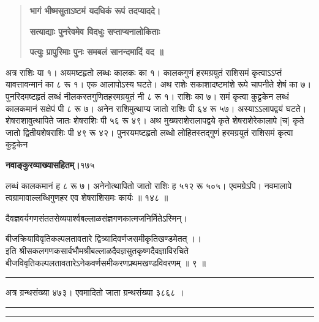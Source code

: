 \documentclass[11pt, openany]{book}
\begin{document}
\begin{sloppypar}
\begin{quote}
\hspace{1in}\textbf{भागं भीष्मसुताऽष्टमं यदधिकं रूपं तदप्याददे।}

\hspace{1in}\textbf{सत्याद्याः पुनरेवमेव विदधुः सप्ताप्यनालोकिताः}

\hspace{1in}\textbf{पत्युः प्रापुरिमाः पुनः समबलं सानन्दमादिं वद ॥}
\end{quote}

\hangindent=0.2in \hspace{0.2in}अत्र राशिः या १। अयमष्टहृतो लब्धः कालकः का १। कालकगुणं हरमग्रयुतं राशिसमं कृत्वाऽऽप्तं यावत्तावन्मानं का ८ रू १। एक आलापोऽस्य घटते। अथ राशेः सकाशादष्टमांशे रूपे चापनीते शेषं का ७। पुनरिदमष्टहृतं लब्धं नीलकस्तगुणितहरमग्रयुतं नी ८ रू १। राशिः का ७। समं कृत्वा कुट्टकेन लब्धं कालकमानं सक्षेपं पी ८ रू ७। अनेन राशिमुत्थाप्य जातो राशिः पी ६४ रू ५७। अस्याऽऽलापद्वयं घटते। शेषराशावुत्थापिते जातः शेषराशिः पी ५६ रू ४९। अथ मुख्यराशेरालापद्वये कृते शेषराशेरेकालापे [च] कृते जातो द्वितीयशेषराशिः पी ४९ रू ४२। पुनरयमष्टहृतो लब्धो लोहितस्तद्गुणं हरमग्रयुतं राशिसमं कृत्वा कुट्टकेन
\end{sloppypar}
\thispagestyle{empty}
\newpage

\onehalfspacing
\hspace{2in}\textbf{नवाङ्कुरव्याख्यासहितम्।}\hspace{2in}१७५

\vspace{5mm}

\begin{sloppypar}
\hangindent=0.2in लब्धं कालकमानं ह ८ रू ७। अनेनोत्थापितो जातो राशिः ह ५१२ रू ५०५। एवमग्रेऽपि। नवमालापे त्वग्रामावाल्लब्धिगुणहर एव शेषराशिसमः कार्यः ॥ १४८ ॥\\

\begin{center}
दैवज्ञवर्यगणसंततसेव्यपार्श्वबल्लाळसंज्ञगणकात्मजनिर्मितेऽस्मिन्।

बीजक्रियाविवृतिकल्पलतावतारे द्वित्र्यादिवर्णजसमीकृतिखण्डमेतत् ।।\\

इति श्रीसकलगणकसार्वभौमश्रीबल्लाळदैवज्ञसुतकृष्णदैवज्ञाविरचिते बीजविवृतिकल्पलतावतारेऽनेकवर्णसमीकरणप्रथमखण्डविवरणम् ॥ ९ ॥

\rule{0.1\linewidth}{0.5pt}

\vspace{2cm}

अत्र ग्रन्थसंख्या ४७३। एवमादितो जाता ग्रन्थसंख्या ३८६८ ।

\vspace{2cm}

\rule{0.1\linewidth}{0.5pt}

\vspace{-5mm}

\rule{0.1\linewidth}{0.5pt}
\end{center}
\end{sloppypar}
\thispagestyle{empty}
\newpage
\end{document}
